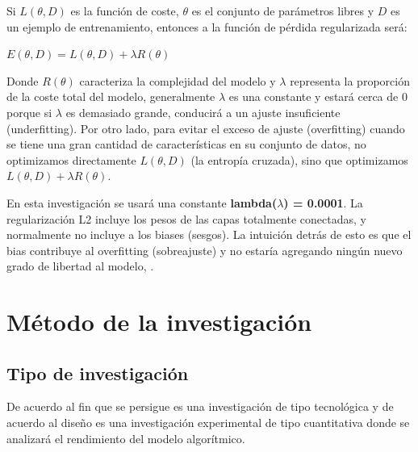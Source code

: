 		Si $L(\theta, D)$ es la función de coste, $\theta$ es el conjunto de parámetros libres y $D$ es un ejemplo de entrenamiento, entonces a la función de pérdida regularizada será:

			\begingroup\makeatletter{}\check@mathfonts
			\begin{center}
			$E(\theta,D) =L(\theta,D) +\lambda R(\theta)$
			\end{center}
			\endgroup
		

		Donde $R(\theta)$ caracteriza la complejidad del modelo y $\lambda$ representa la proporción de la coste total del modelo, generalmente $\lambda$ es una constante y estará cerca de 0 porque si $\lambda$ es demasiado grande, conducirá a un ajuste insuficiente (underfitting). Por otro lado, para evitar el exceso de ajuste (overfitting) cuando se tiene una gran cantidad de características en su conjunto de datos, no optimizamos directamente $L(\theta,D)$ (la entropía cruzada), sino que optimizamos $L(\theta,D) +\lambda R(\theta)$.

		En esta investigación se usará una constante {\bf lambda($\lambda$) = 0.0001}. La regularización L2 incluye los pesos de las capas totalmente conectadas, y normalmente no incluye a los biases (sesgos). La intuición detrás de esto es que el bias contribuye al overfitting (sobreajuste) y no estaría agregando ningún nuevo grado de libertad al modelo, \citep{AulaMLP}.





\section{Método de la investigación}

\subsection{ Tipo de investigación}
	De acuerdo al fin que se persigue es una investigación de tipo tecnológica y de acuerdo al diseño es una investigación experimental de tipo cuantitativa donde se analizará el rendimiento del modelo algorítmico.


